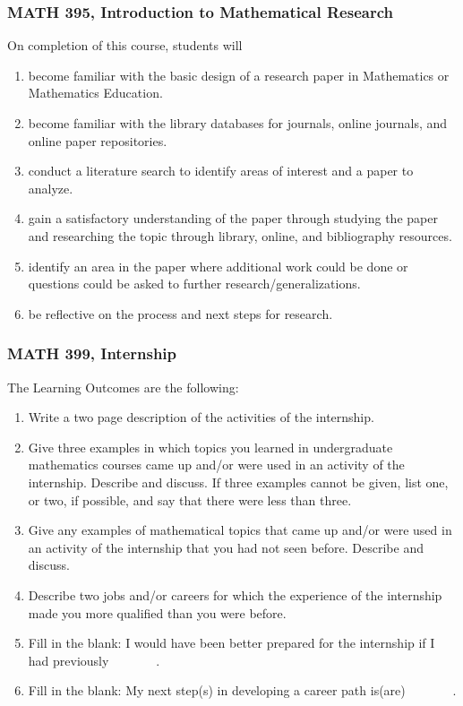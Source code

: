 \documentclass[11pt]{article}
\newenvironment{alphalist}{
\begin{enumerate}[label=(\arabic*),widest=107 ,leftmargin=25pt, itemsep=0pt]}
{\end{enumerate}}
\begin{document}
\subsubsection{MATH 395, Introduction to Mathematical Research}

On completion of this course, students will 
\begin{alphalist}
\item  become familiar with the basic design of a research paper in Mathematics or Mathematics Education.
\item become familiar with the library databases for journals, online journals, and online paper repositories.
\item conduct a literature search to identify areas of interest and a paper to analyze.
\item  gain a satisfactory understanding of the paper through studying the paper and researching the topic through
library, online, and bibliography resources.
\item  identify an area in the paper where additional work could be done or questions could be asked to further
research/generalizations.
\item  be reflective on the process and next steps for research.
\end{alphalist}

\subsubsection{MATH 399, Internship}
The Learning Outcomes are the following:
\begin{alphalist}
    \item Write a two page description of the activities of the 
    internship.
    \item Give three examples in which topics you learned in 
    undergraduate mathematics courses came up and/or were used in an 
    activity of the internship. Describe and discuss. 
    If three examples cannot be given, list one, or two, if possible, 
    and say that there were less than three.
    \item Give any examples of mathematical topics that came up 
    and/or were used in an activity of the internship that you had 
    not seen before. Describe and discuss. 
    \item Describe two jobs and/or careers for which the experience 
    of the internship made you more qualified than you were before.
    \item Fill in the blank: I would have been better prepared for 
    the internship if I had previously \underline{$\phantom{xxxxxx}$}.
    \item Fill in the blank: My next step(s) in developing a career path is(are) 
    \underline{$\phantom{xxxxxx}$}.
\end{alphalist}
\end{document}
